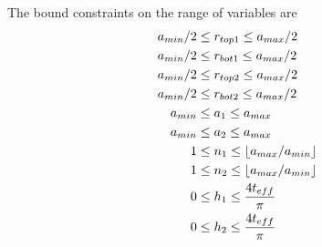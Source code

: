 \documentclass[12pt]{article}
\numberwithin{equation}{section}
\DeclarePairedDelimiter\floor{\lfloor}{\rfloor}
\numberwithin{equation}{section}
\begin{document}
\begin{outline}[enumerate]
The bound constraints on the range of variables are
\begin{align*}
a_{min}/2 & \leq r_{top1} \leq a_{max}/2 \\
a_{min}/2 & \leq r_{bot1} \leq a_{max}/2 \\
a_{min}/2 & \leq r_{top2} \leq a_{max}/2 \\
a_{min}/2 & \leq r_{bot2} \leq a_{max}/2 \\
a_{min} & \leq a_{1} \leq a_{max} \\
a_{min} & \leq a_{2} \leq a_{max} \\
1 & \leq n_1 \leq  \floor{a_{max}/a_{min}} \\
1 & \leq n_2 \leq  \floor{a_{max}/a_{min}} \\
0 & \leq h_1 \leq \frac{4 t_{eff}}{\pi}  \\
0 & \leq h_2 \leq \frac{4 t_{eff}}{\pi}  \\
\end{align*}


\end{outline}
\end{document}
